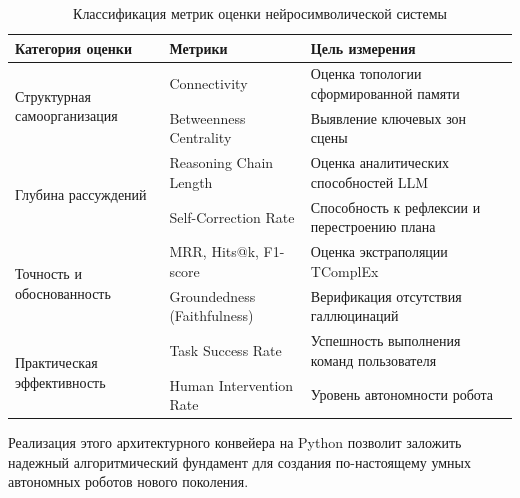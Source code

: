 \begin{table}[htbp]
\caption{Классификация метрик оценки нейросимволической системы}
\label{tab:metrics_classification}
\centering
\begin{tabular}{p{5cm}p{4.5cm}p{6.5cm}}
\hline
Категория оценки & Метрики & Цель измерения \\
\hline
\multirow{2}{5cm}{Структурная самоорганизация} & Connectivity & Оценка топологии сформированной памяти \\
 & Betweenness Centrality & Выявление ключевых зон сцены \\
\hline
\multirow{2}{5cm}{Глубина рассуждений} & Reasoning Chain Length & Оценка аналитических способностей LLM \\
 & Self-Correction Rate & Способность к рефлексии и перестроению плана \\
\hline
\multirow{2}{5cm}{Точность и обоснованность} & MRR, Hits@k, F1-score & Оценка экстраполяции TComplEx \\
 & Groundedness (Faithfulness) & Верификация отсутствия галлюцинаций \\
\hline
\multirow{2}{5cm}{Практическая эффективность} & Task Success Rate & Успешность выполнения команд пользователя \\
 & Human Intervention Rate & Уровень автономности робота \\
\hline
\end{tabular}
\end{table}

Реализация этого архитектурного конвейера на Python позволит заложить надежный алгоритмический фундамент для создания по-настоящему умных автономных роботов нового поколения.